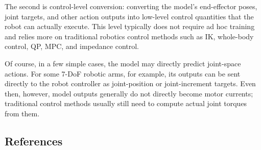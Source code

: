 The second is control-level conversion: converting the model's end-effector poses, joint targets, and other action outputs into low-level control quantities that the robot can actually execute. This level typically does not require ad hoc training and relies more on traditional robotics control methods such as IK, whole-body control, QP, MPC, and impedance control.

Of course, in a few simple cases, the model may directly predict joint-space actions. For some 7-DoF robotic arms, for example, its outputs can be sent directly to the robot controller as joint-position or joint-increment targets. Even then, however, model outputs generally do not directly become motor currents; traditional control methods usually still need to compute actual joint torques from them.

\FloatBarrier
{}
\hypertarget{references-150}{%
\subsection{References}\label{references-150}}

